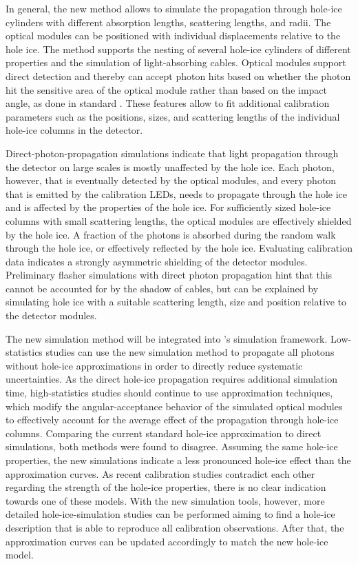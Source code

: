 In general, the new method allows to simulate the propagation through hole-ice cylinders with different absorption lengths, scattering lengths, and radii.
The optical modules can be positioned with individual displacements relative to the hole ice.
The method supports the nesting of several hole-ice cylinders of different properties and the simulation of light-absorbing cables.
Optical modules support direct detection and thereby can accept photon hits based on whether the photon hit the sensitive area of the optical module rather than based on the impact angle, as done in standard \clsim.
These features allow to fit additional calibration parameters such as the positions, sizes, and scattering lengths of the individual hole-ice columns in the \icecube detector.

Direct-photon-propagation simulations indicate that light propagation through the \icecube detector on large scales is mostly unaffected by the hole ice. Each photon, however, that is eventually detected by the optical modules, and every photon that is emitted by the calibration LEDs, needs to propagate through the hole ice and is affected by the properties of the hole ice.
For sufficiently sized hole-ice columns with small scattering lengths, the optical modules are effectively shielded by the hole ice. A fraction of the photons is absorbed during the random walk through the hole ice, or effectively reflected by the hole ice.
Evaluating calibration data indicates a strongly asymmetric shielding of the detector modules. Preliminary flasher simulations with direct photon propagation hint that this cannot be accounted for by the shadow of cables, but can be explained by simulating hole ice with a suitable scattering length, size and position relative to the detector modules.

The new simulation method will be integrated into \icecube's simulation framework.
Low-statistics studies can use the new simulation method to propagate all photons without hole-ice approximations in order to directly reduce systematic uncertainties.
As the direct hole-ice propagation requires additional simulation time, high-statistics studies should continue to use approximation techniques, which modify the angular-acceptance behavior of the simulated optical modules to effectively account for the average effect of the propagation through hole-ice columns.
Comparing the current standard hole-ice approximation to direct simulations, both methods were found to disagree.
Assuming the same hole-ice properties, the new simulations indicate a less pronounced hole-ice effect than the approximation curves.
As recent calibration studies contradict each other regarding the strength of the hole-ice properties, there is no clear indication towards one of these models.
With the new simulation tools, however, more detailed hole-ice-simulation studies can be performed aiming to find a hole-ice description that is able to reproduce all calibration observations.
After that, the approximation curves can be updated accordingly to match the new hole-ice model.

